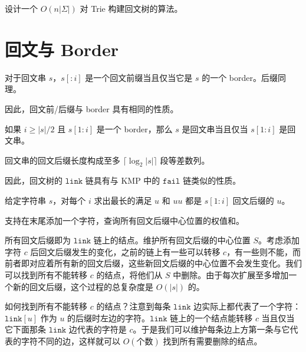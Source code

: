 \begin{exercise}
    设计一个 $O(n|\Sigma|)$ 对 Trie 构建回文树的算法。
\end{exercise}

\section{回文与 Border}

\begin{fact}
    对于回文串 $s$，$s[:i]$ 是一个回文前缀当且仅当它是 $s$ 的一个 border。后缀同理。
\end{fact}

因此，回文前/后缀与 border 具有相同的性质。

\begin{lemma}
    如果 $i\ge |s|/2$ 且 $s[1:i]$ 是一个 border，那么 $s$ 是回文串当且仅当 $s[1:i]$ 是回文串。
\end{lemma}

\begin{lemma}
    回文串的回文后缀长度构成至多 $\lceil\log_2 |s|\rceil$ 段等差数列。
\end{lemma}

因此，回文树的 $\mathtt{link}$ 链具有与 KMP 中的 $\mathtt{fail}$ 链类似的性质。

\begin{exercise}[{[SHOI2011] 双倍回文}]
    给定字符串 $s$，对每个 $i$ 求出最长的满足 $u$ 和 $uu$ 都是 $s[1:i]$ 回文后缀的 $u$。
\end{exercise}

\begin{exercise}
    支持在末尾添加一个字符，查询所有回文后缀中心位置的权值和。
\end{exercise}
\begin{solution}
    所有回文后缀即为 $\mathtt{link}$ 链上的结点。维护所有回文后缀的中心位置 $S$。考虑添加字符 $c$ 后回文后缀发生的变化，之前的链上有一些可以转移 $c$，有一些则不能，而前者即对应着所有新的回文后缀，这些新回文后缀的中心位置不会发生变化。我们可以找到所有不能转移 $c$ 的结点，将他们从 $S$ 中删除。由于每次扩展至多增加一个新的回文后缀，这个过程的总复杂度是 $O(|s|)$ 的。

    如何找到所有不能转移 $c$ 的结点？注意到每条 $\mathtt{link}$ 边实际上都代表了一个字符：$\mathtt{link}[u]$ 作为 $u$ 的后缀时左边的字符。$\mathtt{link}$ 链上的一个结点能转移 $c$ 当且仅当它下面那条 $\mathtt{link}$ 边代表的字符是 $c$。于是我们可以维护每条边上方第一条与它代表的字符不同的边，这样就可以 $O(\text{个数})$ 找到所有需要删除的结点。 
\end{solution}

